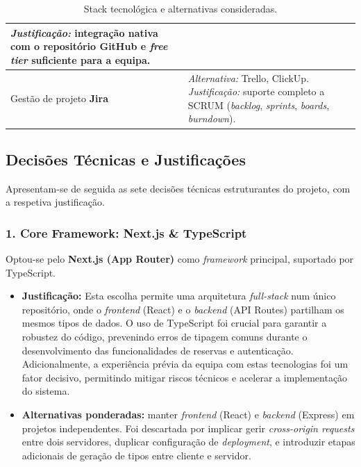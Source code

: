 \documentclass[11pt,a4paper]{article}
\begin{document}
\begin{table}[H]
\begin{tabularx}{\linewidth}{@{}>{\raggedright\arraybackslash}p{4.6cm}X@{}}
        \textit{Justificação:} integração nativa com o repositório GitHub e \emph{free tier} suficiente para a equipa.                                  \\
        \midrule
        Gestão de projeto \newline \textbf{Jira}                                                         & \textit{Alternativa:} Trello, ClickUp. \newline
        \textit{Justificação:} suporte completo a SCRUM (\emph{backlog}, \emph{sprints}, \emph{boards}, \emph{burndown}).                               \\
        \bottomrule
    \end{tabularx}
    \caption{Stack tecnológica e alternativas consideradas.}\label{tab:stack}
\end{table}

\subsection{Decisões Técnicas e Justificações}

Apresentam-se de seguida as sete decisões técnicas estruturantes do projeto,
com a respetiva justificação.

\subsubsection{1. Core Framework: Next.js \& TypeScript}

Optou-se pelo \textbf{Next.js (App Router)} como \emph{framework} principal,
suportado por TypeScript.

\begin{itemize}[leftmargin=*]
    \item \textbf{Justificação:} Esta escolha permite uma arquitetura
          \emph{full-stack} num único repositório, onde o \emph{frontend} (React) e
          o \emph{backend} (API Routes) partilham os mesmos tipos de dados. O uso
          de TypeScript foi crucial para garantir a robustez do código, prevenindo
          erros de tipagem comuns durante o desenvolvimento das funcionalidades de
          reservas e autenticação. Adicionalmente, a experiência prévia da equipa
          com estas tecnologias foi um fator decisivo, permitindo mitigar riscos
          técnicos e acelerar a implementação do sistema.
    \item \textbf{Alternativas ponderadas:} manter \emph{frontend} (React) e
          \emph{backend} (Express) em projetos independentes. Foi descartada por
          implicar gerir \emph{cross-origin requests} entre dois servidores,
          duplicar configuração de \emph{deployment}, e introduzir etapas
          adicionais de geração de tipos entre cliente e servidor.
\end{itemize}
\end{document}
